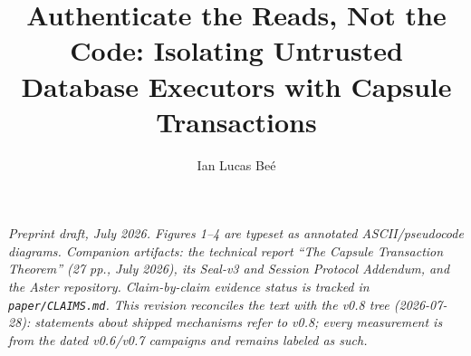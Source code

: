 \documentclass[
  11pt,
]{article}
\title{Authenticate the Reads, Not the Code: Isolating Untrusted Database Executors with Capsule Transactions}
\author{Ian Lucas Beé}
\date{}
\begin{document}
\maketitle

\emph{Preprint draft, July 2026. Figures 1--4 are typeset as annotated ASCII/pseudocode diagrams. Companion artifacts: the technical report ``The Capsule Transaction Theorem'' (27 pp., July 2026), its Seal-v3 and Session Protocol Addendum, and the Aster repository. Claim-by-claim evidence status is tracked in \texttt{paper/CLAIMS.md}. This revision reconciles the text with the v0.8 tree (2026-07-28): statements about shipped mechanisms refer to v0.8; every measurement is from the dated v0.6/v0.7 campaigns and remains labeled as such.}

\begin{abstract}


\end{abstract}
\end{document}
